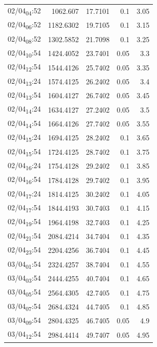 \documentclass[11pt]{article}
\begin{document}
\begin{center}
\begin{tabular}{lrrrr}
02/04\textsubscript{04}:52 & 1062.607 & 17.7101 & 0.1 & 3.05\\[0pt]
02/04\textsubscript{06}:52 & 1182.6302 & 19.7105 & 0.1 & 3.15\\[0pt]
02/04\textsubscript{08}:52 & 1302.5852 & 21.7098 & 0.1 & 3.25\\[0pt]
02/04\textsubscript{10}:54 & 1424.4052 & 23.7401 & 0.05 & 3.3\\[0pt]
02/04\textsubscript{12}:54 & 1544.4126 & 25.7402 & 0.05 & 3.35\\[0pt]
02/04\textsubscript{13}:24 & 1574.4125 & 26.2402 & 0.05 & 3.4\\[0pt]
02/04\textsubscript{13}:54 & 1604.4127 & 26.7402 & 0.05 & 3.45\\[0pt]
02/04\textsubscript{14}:24 & 1634.4127 & 27.2402 & 0.05 & 3.5\\[0pt]
02/04\textsubscript{14}:54 & 1664.4126 & 27.7402 & 0.05 & 3.55\\[0pt]
02/04\textsubscript{15}:24 & 1694.4125 & 28.2402 & 0.1 & 3.65\\[0pt]
02/04\textsubscript{15}:54 & 1724.4125 & 28.7402 & 0.1 & 3.75\\[0pt]
02/04\textsubscript{16}:24 & 1754.4128 & 29.2402 & 0.1 & 3.85\\[0pt]
02/04\textsubscript{16}:54 & 1784.4128 & 29.7402 & 0.1 & 3.95\\[0pt]
02/04\textsubscript{17}:24 & 1814.4125 & 30.2402 & 0.1 & 4.05\\[0pt]
02/04\textsubscript{17}:54 & 1844.4193 & 30.7403 & 0.1 & 4.15\\[0pt]
02/04\textsubscript{19}:54 & 1964.4198 & 32.7403 & 0.1 & 4.25\\[0pt]
02/04\textsubscript{21}:54 & 2084.4214 & 34.7404 & 0.1 & 4.35\\[0pt]
02/04\textsubscript{23}:54 & 2204.4256 & 36.7404 & 0.1 & 4.45\\[0pt]
03/04\textsubscript{01}:54 & 2324.4257 & 38.7404 & 0.1 & 4.55\\[0pt]
03/04\textsubscript{03}:54 & 2444.4255 & 40.7404 & 0.1 & 4.65\\[0pt]
03/04\textsubscript{05}:54 & 2564.4305 & 42.7405 & 0.1 & 4.75\\[0pt]
03/04\textsubscript{07}:54 & 2684.4324 & 44.7405 & 0.1 & 4.85\\[0pt]
03/04\textsubscript{09}:54 & 2804.4325 & 46.7405 & 0.05 & 4.9\\[0pt]
03/04\textsubscript{12}:54 & 2984.4414 & 49.7407 & 0.05 & 4.95\\[0pt]

\end{tabular}
\end{center}
\end{document}
